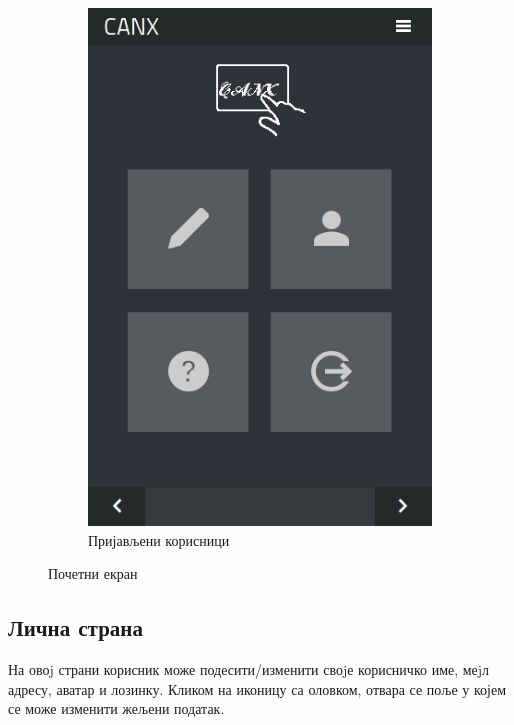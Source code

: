 \documentclass[a4paper]{article}
\begin{document}
\begin{figure}
\begin{subfigure}{.5\textwidth}
  \includegraphics[width=.9\linewidth]{home_auth}
  \caption{Пријављени корисници}
  \label{fig:sub2}
\end{subfigure}
\caption{Почетни екран}
\label{fig:test}
\end{figure}

\subsection{Лична страна}
\label{personal}
На овоj страни корисник може подесити/изменити своjе корисничко име,
меjл адресу, аватар и лозинку. Кликом на иконицу са оловком, отвара се
поље у којем се може изменити жељени податак.
\end{document}
